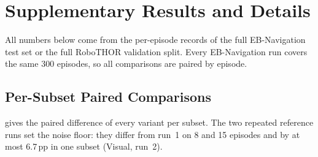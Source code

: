 \section{Supplementary Results and Details}
\label{app:record}

All numbers below come from the per-episode records of the full EB-Navigation test set or the full RoboTHOR
validation split. Every EB-Navigation run covers the same 300 episodes, so all comparisons are paired by episode.

\subsection{Per-Subset Paired Comparisons}
\label{app:stats}
 gives the paired difference of every variant per subset. The two repeated reference runs
set the noise floor: they differ from run~1 on 8 and 15 episodes and by at most 6.7\,pp in one subset (Visual,
run~2).

